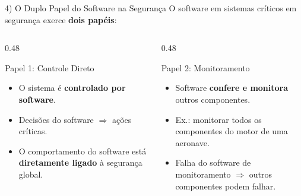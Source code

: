 \documentclass[aspectratio=169]{beamer}
\begin{document}
\begin{frame}{4) O Duplo Papel do Software na Segurança}
  O software em sistemas críticos em segurança exerce \textbf{dois papéis}:

  \vspace{0.5em}
  \begin{columns}
    \begin{column}{0.48\textwidth}
      \begin{block}{Papel 1: Controle Direto}
        \begin{itemize}
          \item O sistema é \textbf{controlado por software}.
          \item Decisões do software $\Rightarrow$ ações críticas.
          \item O comportamento do software está \textbf{diretamente ligado} à segurança global.
        \end{itemize}
      \end{block}
    \end{column}
    \begin{column}{0.48\textwidth}
      \begin{block}{Papel 2: Monitoramento}
        \begin{itemize}
          \item Software \textbf{confere e monitora} outros componentes.
          \item Ex.: monitorar todos os componentes do motor de uma aeronave.
          \item Falha do software de monitoramento $\Rightarrow$ outros componentes podem falhar.
        \end{itemize}
      \end{block}
    \end{column}
  \end{columns}
\end{frame}
\end{document}
